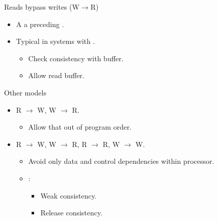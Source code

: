 \begin{frame}[t]{Reads bypass writes (W$\rightarrow$R)}
\begin{itemize}
  \item A   
        a preceding .

  \item Typical in systems with .
    \begin{itemize}
      \item Check consistency with buffer.
      \item Allow read buffer.
    \end{itemize}
\end{itemize}
\end{frame}

\begin{frame}[t]{Other models}
\begin{itemize}
  \item R $\rightarrow$ W, W $\rightarrow$ R.
    \begin{itemize}
      \item Allow that  
             out of program order.
    \end{itemize}

  \item R $\rightarrow$ W, 
        W $\rightarrow$ R, 
        R $\rightarrow$ R, 
        W $\rightarrow$ W.
    \begin{itemize}
      \item Avoid only data and control dependencies within processor.
      \item {}:
        \begin{itemize}
          \item Weak consistency.
          \item Release consistency.
        \end{itemize}
    \end{itemize}
\end{itemize}
\end{frame}

